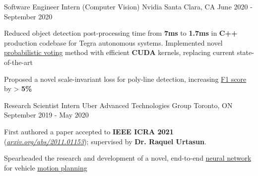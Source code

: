 \begin{cventries}
  \cventry
    {Software Engineer Intern (Computer Vision)} %
    {Nvidia} %
    {Santa Clara, CA} %
    {June 2020 - September 2020} %
    {
      \begin{cvitems} %
        \item {Reduced object detection post-processing time from \textbf{7ms}
        to \textbf{1.7ms} in \textbf{C++} production codebase for Tegra
        autonomous systems. Implemented novel \underline{probabilistic voting}
        method with efficient \textbf{CUDA} kernels, replacing current
        state-of-the-art}
        \item {Proposed a novel scale-invariant loss for poly-line detection, increasing \underline{F1 score} by > \textbf{5\%}}
      \end{cvitems}
    }

  \cventry
    {Research Scientist Intern} %
    {Uber Advanced Technologies Group} %
    {Toronto, ON} %
    {September 2019 - May 2020} %
    {
      \begin{cvitems} %
        \item {First authored a paper accepted to \textbf{IEEE ICRA 2021}} (\href{https://arxiv.org/pdf/2011.01153.pdf}{\underline{\textit{arxiv.org/abs/2011.01153}}});
        supervised by \textbf{Dr. Raquel Urtasun}.
        \item {Spearheaded the research and development of a novel, end-to-end
        \underline{neural network} for vehicle \underline{motion planning}}
      \end{cvitems}
    }


\end{cventries}
